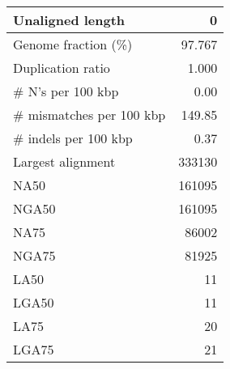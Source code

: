 \documentclass[12pt,a4paper]{article}
\begin{document}
\begin{table}[ht]
\begin{center}
\begin{tabular}{|l*{1}{|r}|}
Unaligned length & 0 \\ \hline
Genome fraction (\%) & 97.767 \\ \hline
Duplication ratio & 1.000 \\ \hline
\# N's per 100 kbp & 0.00 \\ \hline
\# mismatches per 100 kbp & 149.85 \\ \hline
\# indels per 100 kbp & 0.37 \\ \hline
Largest alignment & 333130 \\ \hline
NA50 & 161095 \\ \hline
NGA50 & 161095 \\ \hline
NA75 & 86002 \\ \hline
NGA75 & 81925 \\ \hline
LA50 & 11 \\ \hline
LGA50 & 11 \\ \hline
LA75 & 20 \\ \hline
LGA75 & 21 \\ \hline
\end{tabular}
\end{center}
\end{table}
\end{document}
